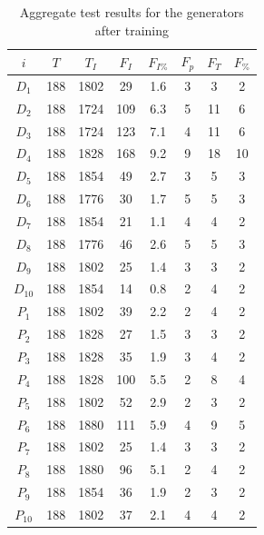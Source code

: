 \documentclass[12pt, titlepage]{report}
\theoremstyle{definition}
\begin{document}
\begin{table}
\begin{tabular}{cSSSSSSS} \toprule
    {$i$}  & {$T$} 	& {$T_I$}	& {$F_I$}   	& {$F_{I\%}$}		    & {$F_p$} 	    & {$F_T$} 	    & {$F_{\%}$} \\ \midrule
    $D_1$  & 188   	& 1802		& 29    	 	& 1.6				    & 3  	 		& 3  	 		& 2 \\
    $D_2$  & 188   	& 1724 		& 109  		    & 6.3					& 5  	 		& 11	 		& 6 \\
    $D_3$  & 188  	& 1724 		& 123  		    & 7.1   				& 4  	 		& 11	 		& 6 \\
    $D_4$  & 188   	& 1828 		& 168  		    & 9.2   				& 9      		& 18    		& 10 \\
    $D_5$  & 188   	& 1854 		& 49   			& 2.7					& 3  		    & 5		  		& 3 \\
    $D_6$  & 188  	& 1776 		& 30	  		& 1.7					& 5		  		& 5	 			& 3 \\
    $D_7$  & 188   	& 1854 		& 21	  		& 1.1					& 4		  		& 4		  		& 2 \\
    $D_8$  & 188   	& 1776 		& 46	  		& 2.6					& 5		 		& 5		  		& 3 \\
    $D_9$  & 188   	& 1802 		& 25	  		& 1.4					& 3		 		& 3	 			& 2\\
    $D_{10}$ & 188  & 1854 		& 14	  		& 0.8					& 2		 		& 4		 		& 2 \\ \midrule
    $P_1$  & 188   	& 1802 		& 39		 	& 2.2					& 2 			& 4		 		& 2 \\
    $P_2$  & 188   	& 1828 		& 27	  		& 1.5					& 3		 		& 3		 		& 2 \\
    $P_3$  & 188   	& 1828 		& 35	  		& 1.9					& 3		 		& 4		 		& 2 \\
    $P_4$  & 188   	& 1828 		& 100  		    & 5.5					& 2		 		& 8		  		& 4 \\
    $P_5$  & 188   	& 1802 		& 52	   		& 2.9					& 2		 		& 3		 		& 2 \\
    $P_6$  & 188   	& 1880 		& 111  		    & 5.9					& 4		 		& 9		 		& 5 \\
    $P_7$  & 188   	& 1802 		& 25	  		& 1.4					& 3		 		& 3		 		& 2 \\
    $P_8$  & 188   	& 1880 		& 96	  		& 5.1					& 2		 		& 4		  		& 2 \\
    $P_9$  & 188   	& 1854 		& 36	  		& 1.9					& 2		 		& 3 			& 2 \\
    $P_{10}$ & 188  & 1802 		& 37  			& 2.1					& 4		 		& 4		 		& 2 \\ \bottomrule
\end{tabular}

\caption{Aggregate test results for the generators after training}
\end{table}
\end{document}
